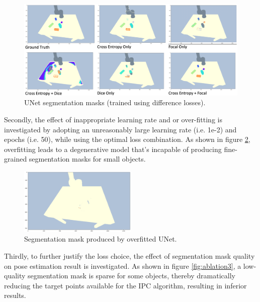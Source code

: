 \documentclass{article}
\begin{document}
    \begin{figure}[H]\centering
        \includegraphics[width=1\textwidth]{ablation1.png}
        \caption{UNet segmentation masks (trained using difference losses).\label{fig:ablation1}}
    \end{figure}
    
    Secondly, the effect of inappropriate learning rate and or over-fitting is investigated
    by adopting an unreasonably large learning rate (i.e. 1e-2) and epochs (i.e. 50), while using
    the optimal loss combination. As shown in figure \ref{fig:ablation2}, overfitting leads
    to a degenerative model that's incapable of producing fine-grained segmentation masks for small objects.

    \begin{figure}[H]\centering
        \includegraphics[width=0.5\textwidth]{ablation2.png}
        \caption{Segmentation mask produced by overfitted UNet.\label{fig:ablation2}}
    \end{figure}

    Thirdly, to further justify the loss choice, the effect of segmentation mask quality on pose estimation result 
    is investigated. As shown in figure \ref{fig:ablation3}, a low-quality segmentation mask is sparse 
    for some objects, thereby dramatically reducing the target points available for the IPC algorithm,
    resulting in inferior results.
\end{document}
